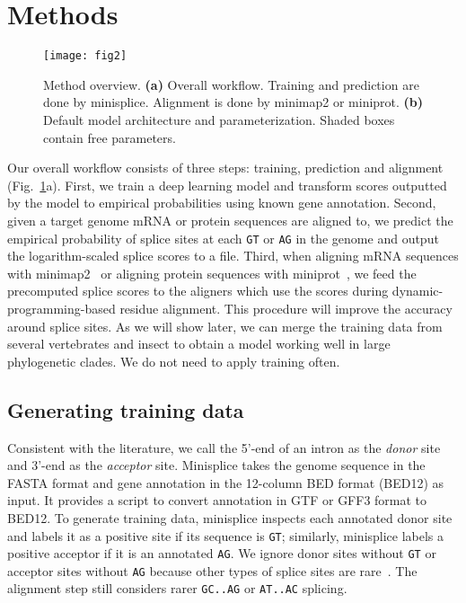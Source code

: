 \documentclass[webpdf,contemporary,large,namedate]{oup-authoring-template}%
\begin{document}
\section{Methods}

\begin{figure}[b]
\texttt{[image: fig2]}
\caption{Method overview. {\bf (a)} Overall workflow.
Training and prediction are done by minisplice.
Alignment is done by minimap2 or miniprot.
{\bf (b)} Default model architecture and parameterization.
Shaded boxes contain free parameters.}\label{fig:wf}
\end{figure}

Our overall workflow consists of three steps: training, prediction and alignment (Fig.~\ref{fig:wf}a).
First, we train a deep learning model and transform scores outputted by the model
to empirical probabilities using known gene annotation.
Second, given a target genome mRNA or protein sequences are aligned to,
we predict the empirical probability of splice sites at each {\tt GT} or {\tt AG} in the genome
and output the logarithm-scaled splice scores to a file.
Third, when aligning mRNA sequences with minimap2~\citep{Li:2018ab} or aligning protein sequences with miniprot~\citep{Li:2023ab},
we feed the precomputed splice scores to the aligners which use the scores during dynamic-programming-based residue alignment.
This procedure will improve the accuracy around splice sites.
As we will show later, we can merge the training data from several vertebrates and insect
to obtain a model working well in large phylogenetic clades.
We do not need to apply training often.

\subsection{Generating training data}

Consistent with the literature, we call the 5'-end of an intron as the \emph{donor} site
and 3'-end as the \emph{acceptor} site.
Minisplice takes the genome sequence in the FASTA format
and gene annotation in the 12-column BED format (BED12) as input.
It provides a script to convert annotation in GTF or GFF3 format to BED12.
To generate training data, minisplice inspects each annotated donor site and labels it as a positive site if its sequence is {\tt GT};
similarly, minisplice labels a positive acceptor if it is an annotated {\tt AG}.
We ignore donor sites without {\tt GT} or acceptor sites without {\tt AG}
because other types of splice sites are rare~\citep{Sibley:2016vh}.
The alignment step still considers rarer {\tt GC..AG} or {\tt AT..AC} splicing.
\end{document}
